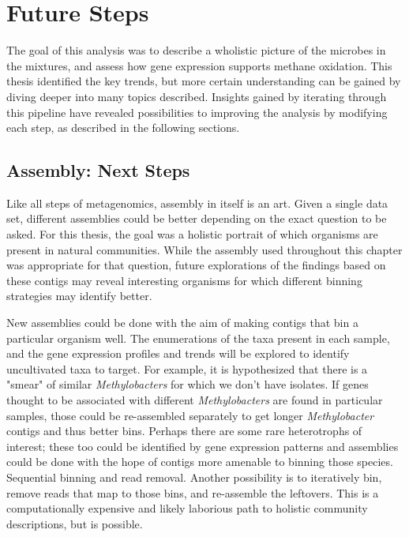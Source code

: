 \section{Future Steps}
\label{chA_future_steps}


The goal of this analysis was to describe a wholistic picture of the microbes in the mixtures, and assess how gene expression supports methane oxidation.
This thesis identified the key trends, but more certain understanding can be gained by diving deeper into many topics described.
Insights gained by iterating through this pipeline have revealed possibilities to improving the analysis by modifying each step, as described in the following sections.

\subsection{Assembly: Next Steps}

Like all steps of metagenomics, assembly in itself is an art.
Given a single data set, different assemblies could be better depending on the exact question to be asked.
For this thesis, the goal was a holistic portrait of which organisms are present in natural communities.
While the assembly used throughout this chapter was appropriate for that question, future explorations of the findings based on these contigs may reveal interesting organisms for which different binning strategies may identify better.

New assemblies could be done with the aim of making contigs that bin a particular organism well.
The enumerations of the taxa present in each sample, and the gene expression profiles and trends will be explored to identify uncultivated taxa to target.
For example, it is hypothesized that there is a "smear" of similar \textit{Methylobacters} for which we don't have isolates.
If genes thought to be associated with different \textit{Methylobacters} are found in particular samples, those could be re-assembled separately to get longer \textit{Methylobacter} contigs and thus better bins.
Perhaps there are some rare heterotrophs of interest; these too could be identified by gene expression patterns and assemblies could be done with the hope of contigs more amenable to binning those species.
Sequential binning and read removal.
Another possibility is to iteratively bin, remove reads that map to those bins, and re-assemble the leftovers.
This is a computationally expensive and likely laborious path to holistic community descriptions, but is possible.

